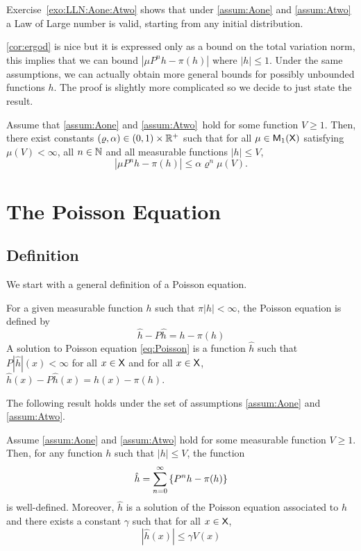 \documentclass[english,graybox,envcountchap,envcountsame,sectrefs,shortlabels]{svmono}
\theoremstyle{style}
\newcommand{\eqsp}{}
\begin{document}
Exercise~\ref{exo:LLN:Aone:Atwo} shows that under \ref{assum:Aone} and \ref{assum:Atwo} a Law of Large number is valid, starting from any initial distribution.

\autoref{cor:ergod} is nice but it is expressed only as a bound on the total variation norm, this implies that we can bound $|\mu P^n h -\pi(h)|$ where $|h|\leq 1$. Under the same assumptions, we can actually obtain more general bounds for possibly unbounded functions $h$. The proof is slightly more complicated so we decide to just state the result.

\begin{theorem} \label{thm:ergo:gener}
 Assume that \ref{assum:Aone} and \ref{assum:Atwo}\ hold for some function $V\geq 1$. Then, there exist constants $(\varrho,\alpha) \in (0,1) \times \mathbb{R}^+$ such that for all $\mu\in\mathsf{M}_{1}(\mathsf{X})$ satisfying $\mu(V)<\infty$, all $n\in\mathbb{N}$ and all measurable functions $|h|\leq V$,
$$
|\mu P^n h -\pi(h)| \leq \alpha \varrho^n \mu(V)\eqsp.
$$
\end{theorem}


\section{The Poisson Equation}
\subsection{Definition}
We start with a general definition of a Poisson equation.

\begin{definition} 
For a given measurable function $h$ such that $\pi|h|<\infty$, the Poisson equation is defined by
\begin{equation} \label{eq:Poisson}
\hat h - P \hat h=h-\pi(h)
\end{equation}
A solution to Poisson equation \eqref{eq:Poisson} is a function $\hat h$ such that $P|\hat h|(x)<\infty$ for all $x\in\mathsf{X}$ and for all $x\in\mathsf{X}$, $\hat h(x) - P \hat h(x)=h(x)-\pi(h)$.
\end{definition}

The following result holds under the set of assumptions \ref{assum:Aone} and \ref{assum:Atwo}.
 \begin{theorem} \label{thm:solPoiss}
 Assume \ref{assum:Aone} and \ref{assum:Atwo} hold for some measurable function $V\geq 1$. Then, for any function $h$ such that $|h|\leq V$, the function
\begin{equation}\label{eq:solPoisson}
\hat h=\sum_{n=0}^\infty \left\{ P^n h-\pi(h)\right\}
\end{equation}
is well-defined. Moreover, $\hat h$ is a solution of the Poisson equation associated to $h$ and there exists a constant $\gamma$ such that  for all $x\in\mathsf{X}$,
$$
|\hat h(x)|\leq \gamma V(x)
$$
 \end{theorem}
\end{document}
